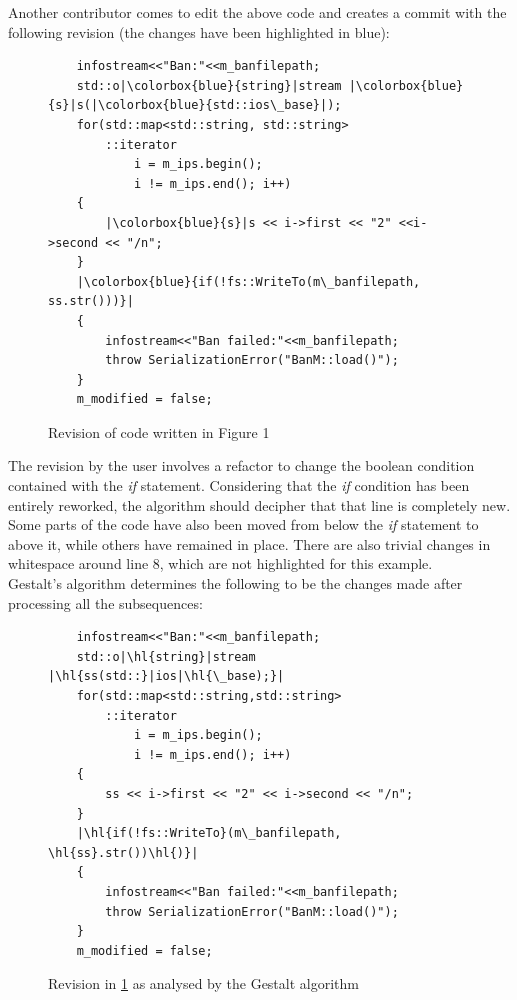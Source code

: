 Another contributor comes to edit the above code and creates a commit with the following revision (the changes have been highlighted in blue):
\begin{figure}
    \centering
    \setlength{\fboxsep}{1pt}
    \begin{verbatim}
    infostream<<"Ban:"<<m_banfilepath;
    std::o|\colorbox{blue}{string}|stream |\colorbox{blue}{s}|s(|\colorbox{blue}{std::ios\_base}|);
    for(std::map<std::string, std::string>
        ::iterator
            i = m_ips.begin();
            i != m_ips.end(); i++)
    {
        |\colorbox{blue}{s}|s << i->first << "2" <<i->second << "/n";
    }
    |\colorbox{blue}{if(!fs::WriteTo(m\_banfilepath, ss.str()))}|
    {
        infostream<<"Ban failed:"<<m_banfilepath;
        throw SerializationError("BanM::load()");
    }
    m_modified = false;
    \end{verbatim}
    \caption{Revision of code written in Figure 1 \citep{ahola_2018}}
    \label{fig:2}
\end{figure}

The revision by the user involves a refactor to change the boolean condition contained with the \textit{if} statement. Considering that the \textit{if} condition has been entirely reworked, the algorithm should decipher that that line is completely new. Some parts of the code have also been moved from below the \textit{if} statement to above it, while others have remained in place. There are also trivial changes in whitespace around line 8, which are not highlighted for this example.\\Gestalt's algorithm determines the following to be the changes made after processing all the subsequences:

\begin{figure}
    \centering
    \begin{verbatim}
    infostream<<"Ban:"<<m_banfilepath;
    std::o|\hl{string}|stream |\hl{ss(std::}|ios|\hl{\_base);}|
    for(std::map<std::string,std::string>
        ::iterator
            i = m_ips.begin();
            i != m_ips.end(); i++)
    {
        ss << i->first << "2" << i->second << "/n";
    }
    |\hl{if(!fs::WriteTo}(m\_banfilepath, \hl{ss}.str())\hl{)}|
    {
        infostream<<"Ban failed:"<<m_banfilepath;
        throw SerializationError("BanM::load()");
    }
    m_modified = false;
    \end{verbatim}
    \caption{Revision in \ref{fig:2} as analysed by the Gestalt algorithm \citep{ahola_2018}}
    \label{fig:3}
\end{figure}

